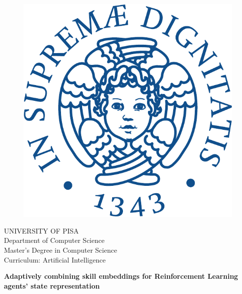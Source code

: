 \begin{titlepage}
\begin{figure}[!htb]
    \centering
    \includegraphics[keepaspectratio=true,scale=0.5]{images/Frontespizio/cherubinFrontespizio-eps-converted-to}
\end{figure}

\begin{center}
    \LARGE{UNIVERSITY OF PISA}
    \vspace{5mm}
    \\ \large{Department of Computer Science}
    \vspace{5mm}
    \\ \LARGE{Master's Degree in Computer Science}
    \\ \LARGE{Curriculum: Artificial Intelligence}
\end{center}


\vspace{7mm}
\begin{center}
    {\LARGE{\bf Adaptively combining skill embeddings for Reinforcement Learning agents' state representation\\ \vspace{5mm}
    }}
    

\end{center}
\end{titlepage}
